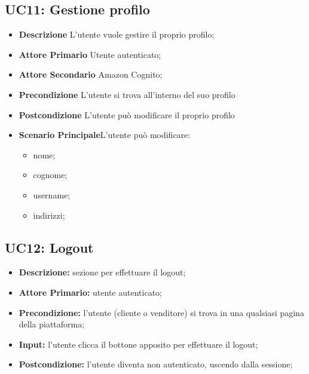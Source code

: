         \subsection{UC11: Gestione profilo}
        \label{sec:UC11}
        \begin{itemize}
            \item \textbf{Descrizione} L'utente vuole gestire il proprio profilo;
            \item \textbf{Attore Primario} Utente autenticato;
            \item \textbf{Attore Secondario} Amazon Cognito;
            \item \textbf{Precondizione} L'utente si trova all'interno del suo profilo
            \item \textbf{Postcondizione} L'utente può modificare il proprio profilo
            \item \textbf{Scenario Principale}L'utente può modificare:
            \begin{itemize}
                \item nome;
                \item cognome;
                \item username;
                \item indirizzi;
            \end{itemize}
        \end{itemize}

        
        \subsection{UC12: Logout}
        \begin{itemize}
            \item \textbf{Descrizione:} sezione per effettuare il logout;
            \item \textbf{Attore Primario:} utente autenticato;
            \item \textbf{Precondizione:} l'utente (cliente o venditore) si trova in una qualsiasi pagina della piattaforma;
            \item \textbf{Input:} l'utente clicca il bottone apposito per effettuare il logout;
            \item \textbf{Postcondizione:} l'utente diventa non autenticato, uscendo dalla sessione;
        \end{itemize}


